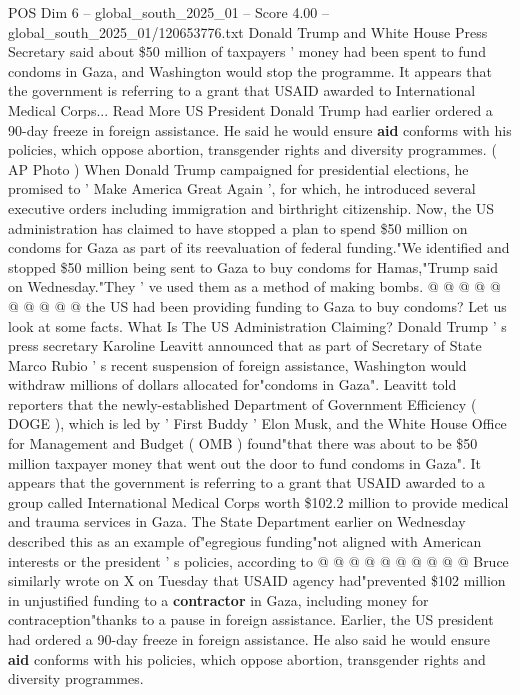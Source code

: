 \begin{textsample}{POS Dim 6 – global\_south\_2025\_01 – Score 4.00 – global\_south\_2025\_01/120653776.txt}  \label{ex:f6_pos_355}
Donald Trump and White House Press Secretary said about \$50 million of taxpayers ' money had been spent to fund condoms in Gaza, and Washington would stop the programme.
It appears that the government is referring to a grant that USAID awarded to International Medical Corps...
Read More US President Donald Trump had earlier ordered a 90-day freeze in foreign assistance.
He said he would ensure \textbf{aid} conforms with his policies, which oppose abortion, transgender rights and diversity programmes. ( AP Photo ) When Donald Trump campaigned for presidential elections, he promised to ' Make America Great Again ', for which, he introduced several executive orders including immigration and birthright citizenship.
Now, the US administration has claimed to have stopped a plan to spend \$50 million on condoms for Gaza as part of its reevaluation of federal funding."We identified and stopped \$50 million being sent to Gaza to buy condoms for Hamas,"Trump said on Wednesday."They ' ve used them as a method of making bombs. @ @ @ @ @ @ @ @ @ @ the US had been providing funding to Gaza to buy condoms?
Let us look at some facts.
What Is The US Administration Claiming?
Donald Trump ' s press secretary Karoline Leavitt announced that as part of Secretary of State Marco Rubio ' s recent suspension of foreign assistance, Washington would withdraw millions of dollars allocated for"condoms in Gaza".
Leavitt told reporters that the newly-established Department of Government Efficiency ( DOGE ), which is led by ' First Buddy ' Elon Musk, and the White House Office for Management and Budget ( OMB ) found"that there was about to be \$50 million taxpayer money that went out the door to fund condoms in Gaza".
It appears that the government is referring to a grant that USAID awarded to a group called International Medical Corps worth \$102.2 million to provide medical and trauma services in Gaza.
The State Department earlier on Wednesday described this as an example of"egregious funding"not aligned with American interests or the president ' s policies, according to @ @ @ @ @ @ @ @ @ @ Bruce similarly wrote on X on Tuesday that USAID agency had"prevented \$102 million in unjustified funding to a \textbf{contractor} in Gaza, including money for contraception"thanks to a pause in foreign assistance.
Earlier, the US president had ordered a 90-day freeze in foreign assistance.
He also said he would ensure \textbf{aid} conforms with his policies, which oppose abortion, transgender rights and diversity programmes.

\end{textsample}
